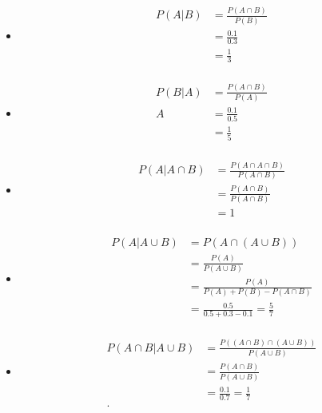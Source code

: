 \documentclass[dvipsnames,a4paper]{book}
\begin{document}
\begin{enumerate}[{Ej1. }]
    \begin{itemize}
        \item \begin{align*}
            P\left(A|B\right)&= \frac{P\left(A\cap B\right)}{P\left(B\right)} \\
            &= \frac{0.1}{0.3} \\
            &= \frac{1}{3} \\\end{align*}
        \item  \begin{align*}
            P\left(B|A\right)&= \frac{P\left(A\cap B\right)}{P\left(A\right)} \\A
            &= \frac{0.1}{0.5} \\
            &= \frac{1}{5} \\
        \end{align*}
        \item \begin{align*}
                P\left(A|A\cap B\right)&= \frac{P\left(A\cap A\cap B\right)}{P\left(A\cap B\right)} \\
                &= \frac{P\left(A\cap B\right)}{P\left(A\cap B\right)} \\
                &= 1 \\
        \end{align*}
        \item \begin{align*}
                P\left(A|A\cup B\right)&= P\left(A\cap \left(A\cup B\right) \right)\\
                &= \frac{P\left(A\right)}{P\left(A\cup B\right)} \\
                &= \frac{P\left(A\right)}{P\left(A\right)+P\left(B\right)-P\left(A\cap B\right)} \\
                &= \frac{0.5}{0.5+0.3-0.1} =\frac{5}{7}\\
        \end{align*}
        \item \begin{align*}
                P\left(A\cap B|A\cup B\right)&= \frac{P\left(\left(A\cap
                B\right)\cap \left(A\cup B\right)  \right)}{P\left(A\cup
                B\right)}\\
                &= \frac{P\left(A\cap B\right)}{P\left(A\cup B\right)} \\
                &= \frac{0.1}{0.7}=\frac{1}{7} \\
        .\end{align*}
    \end{itemize}



\end{enumerate}
\end{document}
